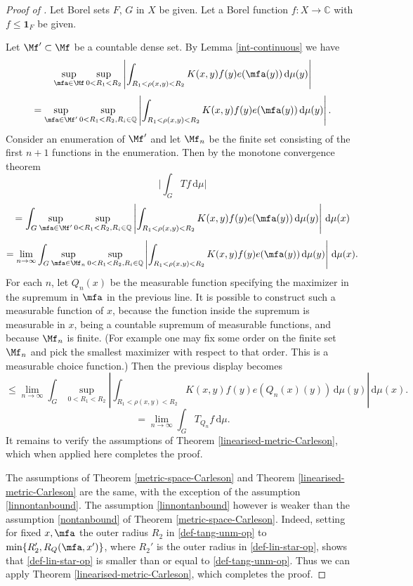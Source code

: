\begin{proof}[Proof of ]
    \leanok
    Let Borel sets $F$, $G$ in $X$ be given. Let a Borel function $f: X \to \mathbb{C}$ with $f \le \mathbf{1}_F$ be given.

    Let $\Mf' \subset \Mf$ be a countable dense set. By Lemma \ref{int-continuous} we have
    \[
        \sup_{\mfa\in\Mf} \sup_{0 < R_1 < R_2}\left| \int_{R_1 < \rho(x,y) < R_2} K(x,y) f(y) e(\mfa(y)) \, \mathrm{d}\mu(y) \right|
    \]
    \[
        = \sup_{\mfa\in\Mf'} \sup_{0 < R_1 < R_2, R_i \in \mathbb{Q}}\left| \int_{R_1 < \rho(x,y) < R_2} K(x,y) f(y) e(\mfa(y)) \, \mathrm{d}\mu(y) \right|.
    \]
    Consider an enumeration of $\Mf'$ and let $\Mf_n$ be the finite set consisting of the first $n+1$ functions in the enumeration. Then by the monotone convergence theorem
    \[
        \Big| \int_G Tf \, \mathrm{d}\mu\Big|
    \]
    \[
        = \int_G \sup_{\mfa\in\Mf'} \sup_{0 < R_1 < R_2, R_i \in \mathbb{Q}}\left| \int_{R_1 < \rho(x,y) < R_2} K(x,y) f(y) e(\mfa(y)) \, \mathrm{d}\mu(y) \right| \, \mathrm{d}\mu(x)
    \]
    \[
        = \lim_{n \to \infty} \int_G \sup_{\mfa\in\Mf_n} \sup_{0 < R_1 < R_2, R_i \in \mathbb{Q}}\left| \int_{R_1 < \rho(x,y) < R_2} K(x,y) f(y) e(\mfa(y)) \, \mathrm{d}\mu(y) \right| \, \mathrm{d}\mu(x).
    \]
    For each $n$, let $Q_n(x)$ be the measurable function specifying the maximizer in the supremum in $\mfa$ in the previous line. It is possible to construct such a measurable function of $x$, because the function inside the supremum is measurable in $x$, being a countable supremum of measurable functions, and because $\Mf_n$ is finite. (For example one may fix some order on the finite set $\Mf_n$ and pick the smallest maximizer with respect to that order. This is a measurable choice function.) Then the previous display becomes
    \[
        \le \lim_{n \to \infty} \int_G \sup_{0 < R_1 < R_2} \left| \int_{R_1 < \rho(x,y) < R_2} K(x,y) f(y) e(Q_n(x)(y)) \, \mathrm{d}\mu(y) \right| \, \mathrm{d}\mu(x).
    \]
    \[
        = \lim_{n \to \infty} \int_G T_{Q_n} f \, \mathrm{d}\mu.
    \]
    It remains to verify the assumptions of Theorem \ref{linearised-metric-Carleson}, which when applied here completes the proof.

    The assumptions of Theorem \ref{metric-space-Carleson} and Theorem \ref{linearised-metric-Carleson} are the same,
    with the exception of the assumption \eqref{linnontanbound}.
    The assumption \eqref{linnontanbound} however is weaker than the assumption \eqref{nontanbound}
    of Theorem \ref{metric-space-Carleson}.
    Indeed, setting for fixed $x, \mfa$ the outer radius $R_2$ in \eqref{def-tang-unm-op} to
    $\min\{R_2', R_Q(\mfa, x')\}$, where $R_2'$ is the outer radius in \eqref{def-lin-star-op},
    shows that \eqref{def-lin-star-op} is smaller than or equal to \eqref{def-tang-unm-op}.
    Thus we can apply Theorem \ref{linearised-metric-Carleson}, which completes the proof.
\end{proof}

